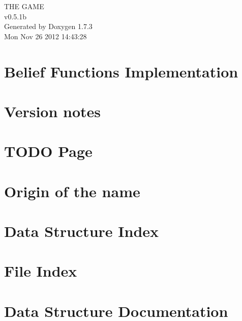 \documentclass[a4paper]{book}
\begin{document}
\hypersetup{pageanchor=false}
\begin{titlepage}
\vspace*{7cm}
\begin{center}
{\Large THE GAME \\[1ex]\large v0.5.1b }\\
\vspace*{1cm}
{\large Generated by Doxygen 1.7.3}\\
\vspace*{0.5cm}
{\small Mon Nov 26 2012 14:43:28}\\
\end{center}
\end{titlepage}
\clearemptydoublepage
{}
\tableofcontents
\clearemptydoublepage
{}
\hypersetup{pageanchor=true}
\chapter{Belief Functions Implementation}
\label{index}\hypertarget{index}{}
\chapter{Version notes}
\label{version_sec}
\hypertarget{version_sec}{}

\chapter{TODO Page}
\label{TODO}
\hypertarget{TODO}{}

\chapter{Origin of the name}
\label{origin_page}
\hypertarget{origin_page}{}

\chapter{Data Structure Index}

\chapter{File Index}

\chapter{Data Structure Documentation}














\end{document}
